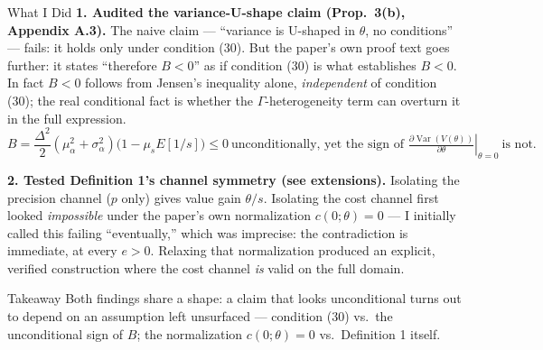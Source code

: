 \documentclass[aspectratio=169,11pt]{beamer}
\begin{document}
\begin{frame}{What I Did}
  \footnotesize
  \textbf{1. Audited the variance-U-shape claim (Prop.\ 3(b), Appendix A.3).}
  The naive claim --- ``variance is U-shaped in $\theta$, no conditions'' ---
  fails: it holds only under condition (30). But the paper's own proof text
  goes further: it states ``therefore $B<0$'' as if condition (30) is what
  establishes $B<0$. In fact $B<0$ follows from Jensen's inequality alone,
  \emph{independent} of condition (30); the real conditional fact is whether
  the $\Gamma$-heterogeneity term can overturn it in the full expression.
  \[
    B=\frac{\Delta^2}{2}(\mu_\alpha^2+\sigma_\alpha^2)\bigl(1-\mu_sE[1/s]\bigr)\leq0
    \ \text{unconditionally, yet the sign of }
    \left.\tfrac{\partial\operatorname{Var}(V(\theta))}{\partial\theta}\right|_{\theta=0}
    \ \text{is not.}
  \]

  \textbf{2. Tested Definition 1's channel symmetry (see extensions).}
  Isolating the precision channel ($p$ only) gives value gain $\theta/s$.
  Isolating the cost channel first looked \emph{impossible} under the
  paper's own normalization $c(0;\theta)=0$ --- I initially called this
  failing ``eventually,'' which was imprecise: the contradiction is
  immediate, at every $e>0$. Relaxing that normalization produced an
  explicit, verified construction where the cost channel \emph{is} valid on
  the full domain.

  \begin{alertblock}{Takeaway}
    \footnotesize Both findings share a shape: a claim that looks
    unconditional turns out to depend on an assumption left unsurfaced ---
    condition (30) vs.\ the unconditional sign of $B$; the normalization
    $c(0;\theta)=0$ vs.\ Definition 1 itself.
  \end{alertblock}
\end{frame}
\end{document}
